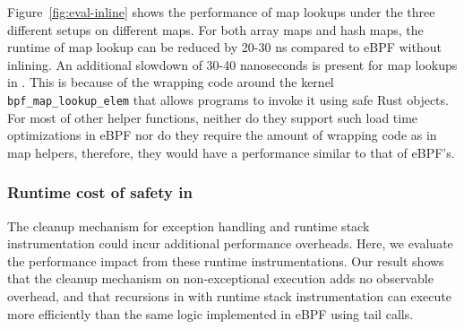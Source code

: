 Figure~\ref{fig:eval-inline} shows the performance of map lookups under the
    three different setups on different maps.
For both array maps and hash maps, the
    runtime of map lookup can be reduced by 20-30 ns compared to eBPF without
    inlining.
An additional slowdown of 30-40 nanoseconds is present for map lookups in
    \projname{}.
This is because of the wrapping code around the kernel
    \texttt{bpf\_map\_lookup\_elem} that allows \projname{} programs to invoke
    it using safe Rust objects.
For most of other helper functions, neither do they support such load time
    optimizations in eBPF nor do they require the amount of wrapping code as in
    map helpers, therefore, they would have a performance similar to that of
    eBPF's.



\subsubsection{Runtime cost of safety in \projname{}}
The cleanup mechanism for exception handling and runtime stack instrumentation
    could incur additional performance overheads.
Here, we evaluate the performance impact from these runtime instrumentations.
Our result shows that the cleanup mechanism on non-exceptional execution adds
    no observable overhead, and that recursions in \projname{} with runtime
    stack instrumentation can execute more efficiently than the same logic
    implemented in eBPF using tail calls.

